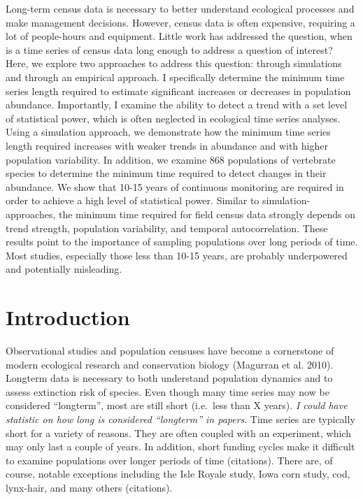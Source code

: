 \documentclass[12pt,]{article}
\begin{document}
Long-term census data is necessary to better understand ecological
processes and make management decisions. However, census data is often
expensive, requiring a lot of people-hours and equipment. Little work
has addressed the question, when is a time series of census data long
enough to address a question of interest? Here, we explore two
approaches to address this question: through simulations and through an
empirical approach. I specifically determine the minimum time series
length required to estimate significant increases or decreases in
population abundance. Importantly, I examine the ability to detect a
trend with a set level of statistical power, which is often neglected in
ecological time series analyses. Using a simulation approach, we
demonstrate how the minimum time series length required increases with
weaker trends in abundance and with higher population variability. In
addition, we examine 868 populations of vertebrate species to determine
the minimum time required to detect changes in their abundance. We show
that 10-15 years of continuous monitoring are required in order to
achieve a high level of statistical power. Similar to
simulation-approaches, the minimum time required for field census data
strongly depends on trend strength, population variability, and temporal
autocorrelation. These results point to the importance of sampling
populations over long periods of time. Most studies, especially those
less than 10-15 years, are probably underpowered and potentially
misleading.

\section{Introduction}\label{introduction}

Observational studies and population censuses have become a cornerstone
of modern ecological research and conservation biology (Magurran et al.
2010). Longterm data is necessary to both understand population dynamics
and to assess extinction risk of species. Even though many time series
may now be considered ``longterm'', most are still short (i.e.~less than
X years). \emph{I could have statistic on how long is considered
``longterm'' in papers}. Time series are typically short for a variety
of reasons. They are often coupled with an experiment, which may only
last a couple of years. In addition, short funding cycles make it
difficult to examine populations over longer periods of time
(citations). There are, of course, notable exceptions including the Isle
Royale study, Iowa corn study, cod, lynx-hair, and many others
(citations).
\end{document}
